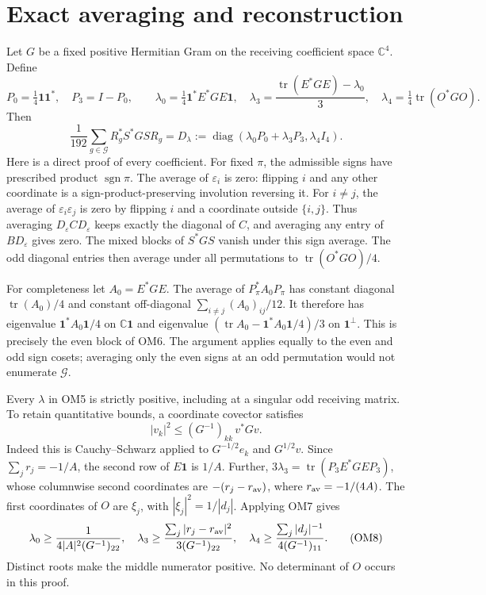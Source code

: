 \documentclass[11pt]{article}
\newcommand{\C}{\mathbb C}
\newcommand{\tr}{\operatorname{tr}}
\newcommand{\diag}{\operatorname{diag}}
\newcommand{\sgn}{\operatorname{sgn}}
\newcommand{\eps}{\varepsilon}
\newcommand{\one}{\mathbf 1}
\begin{document}
\section{Exact averaging and reconstruction}
Let $G$ be a fixed positive Hermitian Gram on the receiving coefficient
space $\C^4$.  Define
\[
P_0=\tfrac14\one\one^*,\quad P_3=I-P_0,\qquad
\lambda_0=\tfrac14\one^*E^*GE\one,\quad
\lambda_3=\frac{\tr(E^*GE)-\lambda_0}{3},\quad
\lambda_4=\tfrac14\tr(O^*GO).
\tag{OM5}
\]
Then
\[
\frac1{192}\sum_{g\in\mathcal G}R_g^*S^*GS R_g
=D_\lambda:=
\diag(\lambda_0P_0+\lambda_3P_3,\lambda_4I_4).
\tag{OM6}
\]
Here is a direct proof of every coefficient.  For fixed $\pi$, the
admissible signs have prescribed product $\sgn\pi$.  The average of
$\eps_i$ is zero: flipping $i$ and any other coordinate is a
sign-product-preserving involution reversing it.  For $i\ne j$,
the average of $\eps_i\eps_j$ is zero by flipping $i$ and a coordinate
outside $\{i,j\}$.  Thus averaging $D_\eps C D_\eps$ keeps exactly
the diagonal of $C$, and averaging any entry of $B D_\eps$ gives
zero.  The mixed blocks of $S^*GS$ vanish under this sign average.
The odd diagonal entries then average under all permutations to
$\tr(O^*GO)/4$.

For completeness let $A_0=E^*GE$.  The average of $P_\pi^*A_0P_\pi$
has constant diagonal $\tr(A_0)/4$ and constant off-diagonal
$\sum_{i\ne j}(A_0)_{ij}/12$.  It therefore has eigenvalue
$\one^*A_0\one/4$ on $\C\one$ and eigenvalue
$(\tr A_0-\one^*A_0\one/4)/3$ on $\one^\perp$.
This is precisely the even block of OM6.  The argument applies
equally to the even and odd sign cosets; averaging only the
even signs at an odd permutation would not enumerate $\mathcal G$.

Every $\lambda$ in OM5 is strictly positive, including at a singular
odd receiving matrix.  To retain quantitative bounds, a coordinate
covector satisfies
\[
|v_k|^2\le (G^{-1})_{kk}\,v^*Gv.
\tag{OM7}
\]
Indeed this is Cauchy--Schwarz applied to $G^{-1/2}e_k$ and
$G^{1/2}v$.  Since $\sum_jr_j=-1/A$, the second row of $E\one$
is $1/A$.  Further,
$3\lambda_3=\tr(P_3E^*GE P_3)$, whose columnwise second coordinates
are $-(r_j-r_{\rm av})$, where $r_{\rm av}=-1/(4A)$.
The first coordinates of $O$ are $\xi_j$, with
$|\xi_j|^2=1/|d_j|$.  Applying OM7 gives
\[
\lambda_0\ge\frac1{4|A|^2(G^{-1})_{22}},\quad
\lambda_3\ge
\frac{\sum_j|r_j-r_{\rm av}|^2}{3(G^{-1})_{22}},\quad
\lambda_4\ge\frac{\sum_j|d_j|^{-1}}{4(G^{-1})_{11}}.
\tag{OM8}
\]
Distinct roots make the middle numerator positive.  No determinant
of $O$ occurs in this proof.
\end{document}
